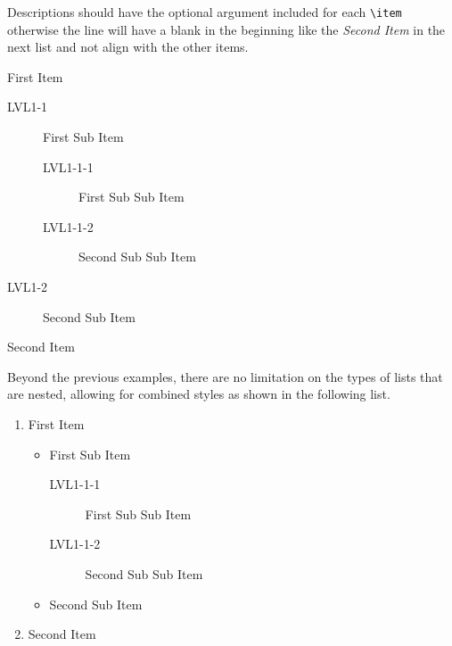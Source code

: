 			Descriptions should have the optional argument included for each \lstinline|\item| otherwise the line will have a blank in the beginning like the \textit{Second Item} in the next list and not align with the other items.
			\begin{description}
				\item[LVL1] First Item
					\begin{description}
						\item[LVL1-1] First Sub Item
							\begin{description}
								\item[LVL1-1-1] First Sub Sub Item
								\item[LVL1-1-2] Second Sub Sub Item
							\end{description}
						\item[LVL1-2] Second Sub Item
					\end{description}
				\item Second Item
			\end{description}
			Beyond the previous examples, there are no limitation on the types of lists that are nested, allowing for combined styles as shown in the following list.
			\begin{enumerate}
				\item First Item
					\begin{itemize}
						\item First Sub Item
							\begin{description}
								\item[LVL1-1-1] First Sub Sub Item
								\item[LVL1-1-2] Second Sub Sub Item
							\end{description}
						\item Second Sub Item
					\end{itemize}
				\item Second Item
			\end{enumerate}
